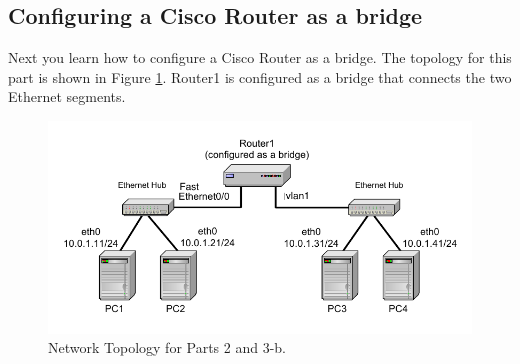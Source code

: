\newpage
\subsection{Configuring a Cisco Router as a bridge}

Next you learn how to configure a Cisco Router as a bridge. The topology for this part is shown in Figure \ref{fig:lab6-network2}. Router1 is configured as a bridge that connects the two Ethernet segments.

\begin{figure}[h!t]
	\centering
	\includegraphics[width=\linewidth]{graphics/lab6-network2-updated.pdf}	
	\caption{Network Topology for Parts 2 and 3-b.}
	\label{fig:lab6-network2}
\end{figure}

